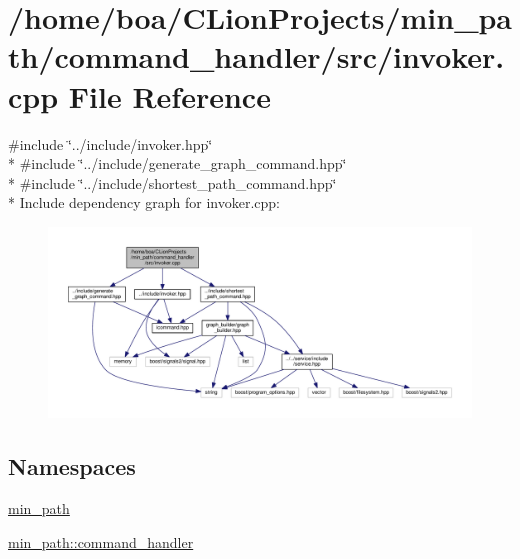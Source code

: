 \hypertarget{a00027}{}\section{/home/boa/\+C\+Lion\+Projects/min\+\_\+path/command\+\_\+handler/src/invoker.cpp File Reference}
\label{a00027}
{\ttfamily \#include \char`\"{}../include/invoker.\+hpp\char`\"{}}\\*
{\ttfamily \#include \char`\"{}../include/generate\+\_\+graph\+\_\+command.\+hpp\char`\"{}}\\*
{\ttfamily \#include \char`\"{}../include/shortest\+\_\+path\+\_\+command.\+hpp\char`\"{}}\\*
Include dependency graph for invoker.\+cpp\+:
\nopagebreak
\begin{figure}[H]
\begin{center}
\leavevmode
\includegraphics[width=350pt]{d7/df7/a00058}
\end{center}
\end{figure}
\subsection*{Namespaces}
\begin{DoxyCompactItemize}
\item 
 \hyperlink{a00033}{min\+\_\+path}
\item 
 \hyperlink{a00035}{min\+\_\+path\+::command\+\_\+handler}
\end{DoxyCompactItemize}

